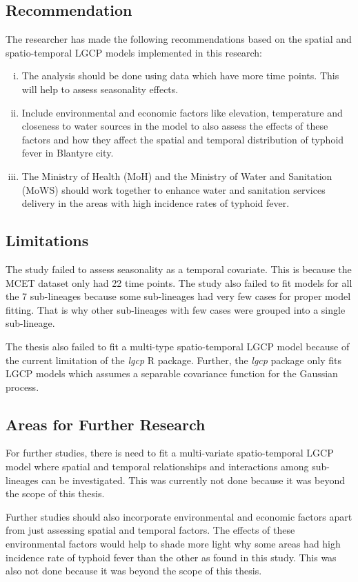 \subsection{Recommendation}

The researcher has made the following recommendations based on the spatial and spatio-temporal LGCP models implemented in this research:

\begin{enumerate}[i.]
\item The analysis should be done using data which have more time points. This will help to assess seasonality effects.
\item Include environmental and economic factors like elevation, temperature and closeness to water sources in the model to also assess the effects of these factors and how they affect the spatial and temporal distribution of typhoid fever in Blantyre city.
\item The Ministry of Health (MoH) and the Ministry of Water and Sanitation (MoWS) should work together to enhance water and sanitation services delivery in the areas with high incidence rates of typhoid fever.
\end{enumerate}

\subsection{Limitations}

The study failed to assess seasonality as a temporal covariate. This is because the MCET dataset only had 22 time points. The study also failed to fit models for all the 7 sub-lineages because some sub-lineages had very few cases for proper model fitting. That is why other sub-lineages with few cases were grouped into a single sub-lineage. 

The thesis also failed to fit a multi-type spatio-temporal LGCP model because of the current limitation of the \textit{lgcp} R package. Further, the \textit{lgcp} package only fits LGCP models which assumes a separable covariance function for the Gaussian process.

\subsection{Areas for Further Research}

For further studies, there is need to fit a multi-variate spatio-temporal LGCP model where spatial and temporal relationships and interactions among sub-lineages can be investigated. This was currently not done because it was beyond the scope of this thesis.

Further studies should also incorporate environmental and economic factors apart from just assessing spatial and temporal factors. The effects of these environmental factors would help to shade more light why some areas had high incidence rate of typhoid fever than the other as found in this study. This was also not done because it was beyond the scope of this thesis.
